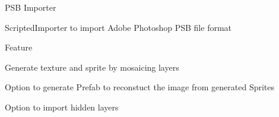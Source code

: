 P\+SB Importer

Scripted\+Importer to import Adobe Photoshop P\+SB file format

Feature
\begin{DoxyItemize}
\item Generate texture and sprite by mosaicing layers
\item Option to generate Prefab to reconstuct the image from generated Sprites
\item Option to import hidden layers 
\end{DoxyItemize}